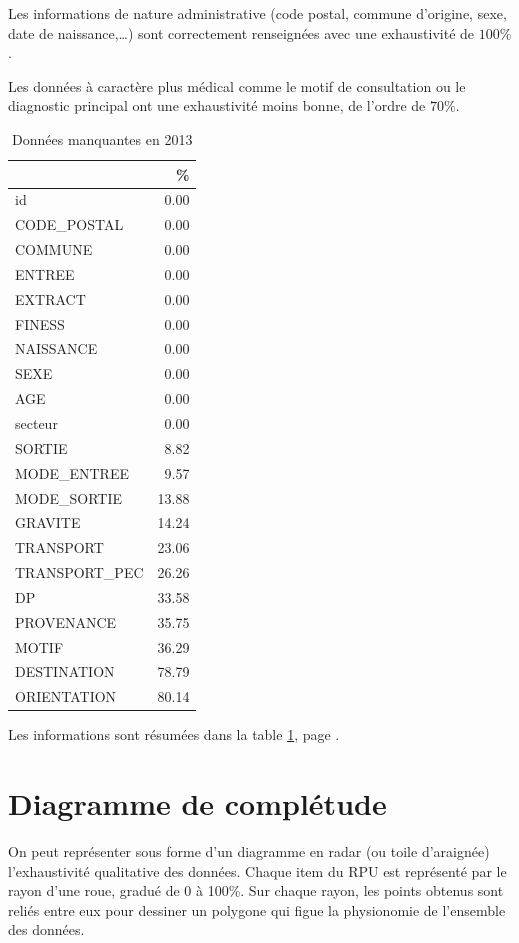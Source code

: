 \documentclass[12pt,english,french,twoside]{book}\usepackage[]{graphicx}\usepackage[]{color}
\begin{document}
Les informations de nature administrative (code postal, commune d'origine, sexe, date de naissance,\dots ) sont correctement renseignées avec une exhaustivité de $100\%$.

Les données à caractère plus médical comme le motif de consultation ou le diagnostic principal ont une exhaustivité moins bonne, de l'ordre de $70\%$.

\begin{table}[ht]
\centering
\begin{tabular}{|l|r|}
  \hline
 & \% \\ 
  \hline
id & 0.00 \\ 
  CODE\_POSTAL & 0.00 \\ 
  COMMUNE & 0.00 \\ 
  ENTREE & 0.00 \\ 
  EXTRACT & 0.00 \\ 
  FINESS & 0.00 \\ 
  NAISSANCE & 0.00 \\ 
  SEXE & 0.00 \\ 
  AGE & 0.00 \\ 
  secteur & 0.00 \\ 
  SORTIE & 8.82 \\ 
  MODE\_ENTREE & 9.57 \\ 
  MODE\_SORTIE & 13.88 \\ 
  GRAVITE & 14.24 \\ 
  TRANSPORT & 23.06 \\ 
  TRANSPORT\_PEC & 26.26 \\ 
  DP & 33.58 \\ 
  PROVENANCE & 35.75 \\ 
  MOTIF & 36.29 \\ 
  DESTINATION & 78.79 \\ 
  ORIENTATION & 80.14 \\ 
   \hline
\end{tabular}
\caption{Données manquantes en 2013} 
\label{tab2}
\end{table}



Les informations sont résumées dans la table \ref{tab2}, page \pageref{tab2}.

\section{Diagramme de complétude}

On peut représenter sous forme d'un diagramme en radar (ou toile d'araignée) l'exhaustivité qualitative des données. Chaque item du RPU est représenté par le rayon d'une roue, gradué de 0 à 100\%. Sur chaque rayon, les points obtenus sont reliés entre eux pour dessiner un polygone qui figue la physionomie de l'ensemble des données.
\end{document}
